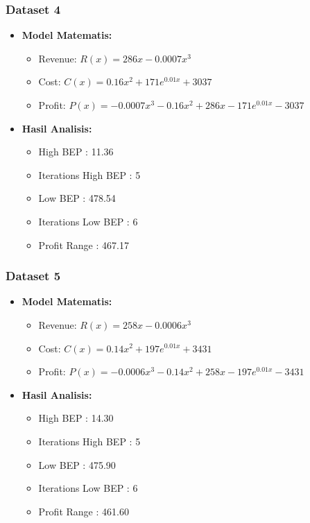 \documentclass[conference]{IEEEtran}
\begin{document}
\subsubsection{Dataset 4}
\begin{itemize}
\item \textbf{Model Matematis:}
\begin{itemize}
\item Revenue: \( R(x) = 286x - 0.0007x^3 \)
\item Cost: \( C(x) = 0.16x^2 + 171e^{0.01x} + 3037 \)
\item Profit: \( P(x) = -0.0007x^3 - 0.16x^2 + 286x - 171e^{0.01x} - 3037 \)
\end{itemize}
\item \textbf{Hasil Analisis:}
\begin{itemize}
\item High BEP              : 11.36
\item Iterations High BEP   : 5
\item Low BEP               : 478.54
\item Iterations Low BEP    : 6
\item Profit Range : 467.17
\end{itemize}
\end{itemize}

\subsubsection{Dataset 5}
\begin{itemize}
\item \textbf{Model Matematis:}
\begin{itemize}
\item Revenue: \( R(x) = 258x - 0.0006x^3 \)
\item Cost: \( C(x) = 0.14x^2 + 197e^{0.01x} + 3431 \)
\item Profit: \( P(x) = -0.0006x^3 - 0.14x^2 + 258x - 197e^{0.01x} - 3431 \)
\end{itemize}
\item \textbf{Hasil Analisis:}
\begin{itemize}
\item High BEP : 14.30
\item Iterations High BEP : 5
\item Low BEP : 475.90
\item Iterations Low BEP : 6
\item Profit Range : 461.60
\end{itemize}
\end{itemize}
\end{document}
